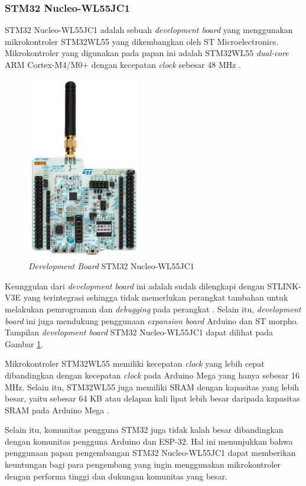\subsubsection{STM32 Nucleo-WL55JC1}
STM32 Nucleo-WL55JC1 adalah sebuah \textit{development board} yang menggunakan mikrokontroler STM32WL55 yang dikembangkan oleh ST Microelectronics. Mikrokontroler yang digunakan pada papan ini adalah STM32WL55 \textit{dual-core} ARM Cortex-M4/M0+ dengan kecepatan \textit{clock} sebesar 48 MHz \cite{STMicroelectronics2022}.

\begin{figure}[H]
	\centering
	\includegraphics[width=5cm]{contents/chapter-2/stm32-wl55jc1.jpg}
	\caption{\textit{Development Board} STM32 Nucleo-WL55JC1}
	\label{Fig: STM32 Nucleo-WL55JC1}
\end{figure}

Keunggulan dari \textit{development board} ini adalah sudah dilengkapi dengan STLINK-V3E yang terintegrasi sehingga tidak memerlukan perangkat tambahan untuk melakukan pemrograman dan \textit{debugging} pada perangkat \cite{STMicroelectronics2022}. Selain itu, \textit{development board} ini juga mendukung penggunaan \textit{expansion board} Arduino dan ST morpho. Tampilan \textit{development board} STM32 Nucleo-WL55JC1 dapat dilihat pada Gambar \ref{Fig: STM32 Nucleo-WL55JC1}.

Mikrokontroler STM32WL55 memiliki kecepatan \textit{clock} yang lebih cepat dibandingkan dengan kecepatan \textit{clock} pada Arduino Mega yang hanya sebesar 16 MHz. Selain itu, STM32WL55 juga memiliki SRAM dengan kapasitas yang lebih besar, yaitu sebesar 64 KB atau delapan kali lipat lebih besar daripada kapasitas SRAM pada Arduino Mega \cite{STMicroelectronics2022b}.

Selain itu, komunitas pengguna STM32 juga tidak kalah besar dibandingkan dengan komunitas pengguna Arduino dan ESP-32. Hal ini menunjukkan bahwa penggunaan papan pengembangan STM32 Nucleo-WL55JC1 dapat memberikan keuntungan bagi para pengembang yang ingin menggunakan mikrokontroler dengan performa tinggi dan dukungan komunitas yang besar.

